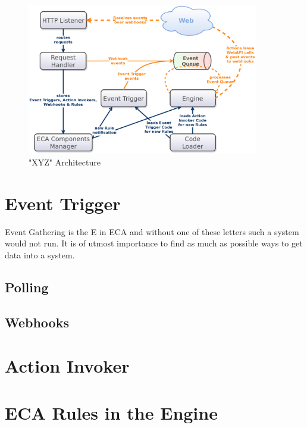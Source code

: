 \begin{figure}[!ht]
	\centering
  \includegraphics[width=0.9\textwidth]{figures/Architecture_wET}
	\caption{"XYZ" Architecture}
	\label{fig:Architecture_wET}
\end{figure}


\section{Event Trigger}

Event Gathering is the E in ECA and without one of these letters such a system would not run.
It is of utmost importance to find as much as possible ways to get data into a system.



\subsection{Polling}

\subsection{Webhooks}







\section{Action Invoker}


\section{ECA Rules in the Engine}

